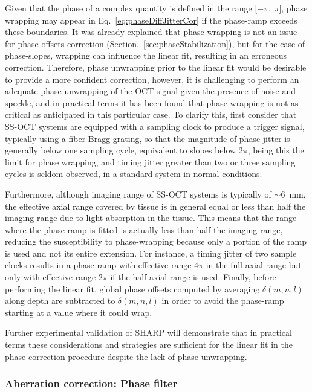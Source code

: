 Given that the phase of a complex quantity is defined in the range [$-\pi,\ \pi$], phase wrapping may appear in Eq.~\ref{eq:phaseDiffJitterCor} if the phase-ramp exceeds these boundaries. It was already explained that phase wrapping is not an issue for phase-offsets correction (Section.~\ref{sec:phaseStabilization}), but for the case of phase-slopes, wrapping can influence the linear fit, resulting in an erroneous correction. Therefore, phase unwrapping prior to the linear fit would be desirable to provide a more confident correction, however, it is challenging to perform an adequate phase unwrapping of the OCT signal given the presence of noise and speckle, and in practical terms it has been found that phase wrapping is not as critical as anticipated in this particular case. To clarify this, first consider that SS-OCT systems are equipped with a sampling clock to produce a trigger signal, typically using a fiber Bragg grating, so that the magnitude of phase-jitter is generally below one sampling cycle, equivalent to slopes below $2\pi$, being this the limit for phase wrapping, and timing jitter greater than two or three sampling cycles is seldom observed, in a standard system in normal conditions.

Furthermore, although imaging range of SS-OCT systems is typically of $\sim$6~mm, the effective axial range covered by tissue is in general equal or less than half the imaging range due to light absorption in the tissue. This means that the range where the phase-ramp is fitted is actually less than half the imaging range, reducing the susceptibility to phase-wrapping because only a portion of the ramp is used and not its entire extension. For instance, a timing jitter of two sample clocks results in a phase-ramp with effective range $4\pi$ in the full axial range but only with effective range $2\pi$ if the half axial range is used. Finally, before performing the linear fit, global phase offsets computed by averaging $\delta(m,n,l)$ along depth are subtracted to $\delta(m,n,l)$ in order to avoid the phase-ramp starting at a value where it could wrap.

Further experimental validation of SHARP will demonstrate that in practical terms these considerations and strategies are sufficient for the linear fit in the phase correction procedure despite the lack of phase unwrapping.

\subsubsection{Aberration correction: Phase filter}

